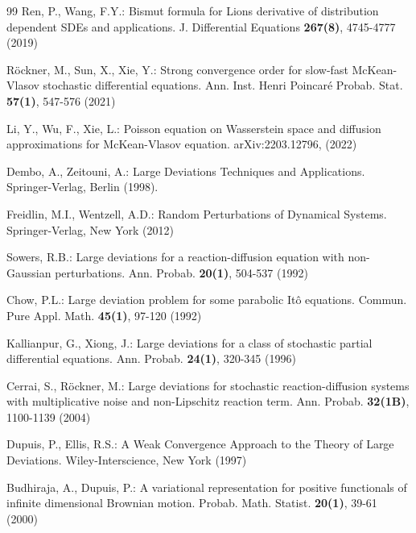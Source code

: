 \documentclass[11pt]{article}
\numberwithin{equation}{section}
\theoremstyle{plain}
\begin{document}
\begin{thebibliography}{99}
  Ren, P.,  Wang, F.Y.:
  Bismut formula for Lions derivative of distribution dependent SDEs and applications.
  J. Differential Equations {\bf 267(8)}, 4745-4777 (2019)

  R\"{o}ckner, M.,  Sun, X.,  Xie, Y.:
  Strong convergence order for slow-fast McKean-Vlasov stochastic differential equations.
  Ann. Inst. Henri Poincar\'{e} Probab. Stat. {\bf 57(1)}, 547-576 (2021)

  Li, Y.,  Wu, F.,  Xie, L.:
  Poisson equation on Wasserstein space and diffusion approximations for McKean-Vlasov equation.
  arXiv:2203.12796, (2022)




  Dembo, A.,  Zeitouni, A.:
  Large Deviations Techniques and Applications.
  Springer-Verlag, Berlin (1998).


  Freidlin, M.I.,  Wentzell, A.D.:
  Random Perturbations of Dynamical Systems.
  Springer-Verlag, New York (2012)




  Sowers, R.B.:
  Large deviations for a reaction-diffusion equation with non-Gaussian perturbations.
  Ann. Probab. {\bf 20(1)}, 504-537 (1992)


  Chow, P.L.:
  Large deviation problem for some parabolic It\^{o} equations.
  Commun. Pure Appl. Math.  {\bf 45(1)}, 97-120 (1992)

  Kallianpur, G.,  Xiong, J.:
  Large deviations for a class of stochastic partial differential equations.
  Ann. Probab. {\bf 24(1)}, 320-345 (1996)


  Cerrai, S.,  R\"{o}ckner, M.:
  Large deviations for stochastic reaction-diffusion systems with multiplicative noise and non-Lipschitz reaction term.
  Ann. Probab. {\bf 32(1B)}, 1100-1139 (2004)




  Dupuis, P.,  Ellis, R.S.:
  A Weak Convergence Approach to the Theory of Large Deviations.
  Wiley-Interscience, New York (1997)

  Budhiraja, A.,  Dupuis, P.:
  A variational representation for positive functionals of infinite dimensional Brownian motion.
  Probab. Math. Statist. {\bf 20(1)}, 39-61 (2000)



\end{thebibliography}
\end{document}
